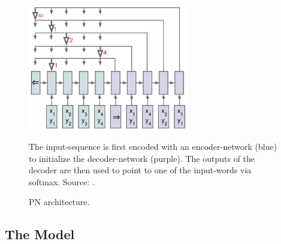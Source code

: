 \documentclass[twoside,11pt,a4paper]{article}
\theoremstyle{break}
\begin{document}
\begin{figure}
	\begin{center}
		\includegraphics[width=7cm]{ptrnet.png}
		\caption{PN architecture.}
		The input-sequence is first encoded with an encoder-network (blue) to initialize the decoder-network (purple). The outputs of the decoder are then used to point to one of the input-words via softmax. Source: \cite{vinyals:2015}.
		\label{fig:ptrnet}
	\end{center}
\end{figure}


\subsection{The Model}
\end{document}
